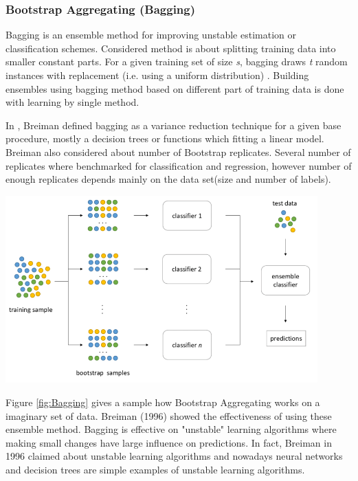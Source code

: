 \subsubsection{Bootstrap Aggregating (Bagging)}
Bagging is an ensemble method for improving unstable estimation or classification schemes. Considered method is about splitting training data into smaller constant parts. For a given training set of size \textit{s}, bagging draws \textit{t} random instances with replacement (i.e. using a uniform distribution) \cite{SupervisedMachineLearningReviewClassification, BaggingDef}. Building ensembles using bagging method based on different part of training data is done with learning by single method. 

In \cite{BreimanBagging}, Breiman defined bagging as a variance reduction technique for a given base procedure, mostly a decision trees or functions which fitting a linear model.
Breiman also considered about number of Bootstrap replicates. Several number of replicates where benchmarked for classification and regression, however number of enough replicates depends mainly on the data set(size and number of labels).
\begin{center}	
	\includegraphics[width=12cm, keepaspectratio]{diagrams/bagging.png}
	\center
	\label{fig:Bagging}
\end{center}

Figure \ref{fig:Bagging} gives a sample how Bootstrap Aggregating works on a imaginary set of data. Breiman (1996) showed the effectiveness of using these ensemble method. Bagging is effective on "unstable" learning algorithms where making small changes have large influence on predictions. In fact, Breiman in 1996 claimed about unstable learning algorithms and nowadays neural networks and decision trees are simple examples of unstable learning algorithms. 

